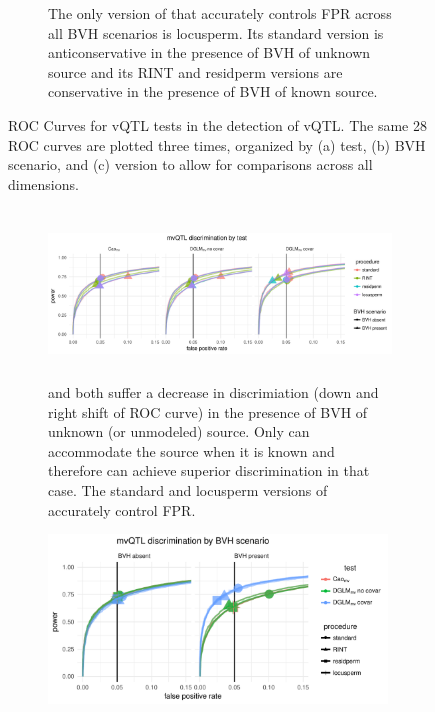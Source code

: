 \begin{figure}[ht]
\begin{subfigure}{\textwidth}
          \caption{
          The only version of \DGLMv that accurately controls FPR across all BVH scenarios is locusperm.
          Its standard version is anticonservative in the presence of BVH of unknown source and its RINT and residperm versions are conservative in the presence of BVH of known source.
          }
      \end{subfigure}
      \caption[
        ROC Curves for vQTL tests in the detection of vQTL.
      ]
      {
        ROC Curves for vQTL tests in the detection of vQTL.
        The same 28 ROC curves are plotted three times, organized by (a) test, (b) BVH scenario, and (c) version to allow for comparisons across all dimensions.
      }
      \label{fig:vqtl_rocs_supp}
  \end{figure}


  \begin{figure}[ht]
      \begin{subfigure}{\textwidth}
          \centering
          \includegraphics[height = 4.5cm]{images/rocs_mvqtl_all_facet_by_test.pdf}
          \caption{
          \Caomv and \DGLMmv both suffer a decrease in discrimiation (down and right shift of ROC curve) in the presence of BVH of unknown (or unmodeled) source.
          Only \DGLMmv can accommodate the source when it is known and therefore can achieve superior discrimination in that case.
          The standard and locusperm versions of \DGLMmv accurately control FPR.
          }
      \vspace*{0.5cm}
      \end{subfigure}
      \begin{subfigure}{\textwidth}
          \centering
          \includegraphics[height = 4.5cm]{images/rocs_mvqtl_all_facet_by_bvh.pdf}

\end{subfigure}
\end{figure}
